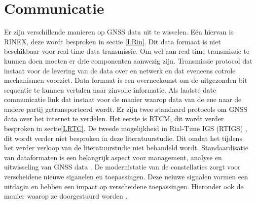 \section{Communicatie}
\label{LCom}
Er zijn verschillende manieren op GNSS data uit te wisselen. E\'en hiervan is RINEX, deze wordt besproken in sectie \ref{LRin}. Dit data formaat is niet beschikbaar voor real-time data transmissie. Om wel aan real-time transmissie te kunnen doen moeten er drie componenten aanwezig zijn. Transmissie protocol dat instaat voor de levering van de data over en netwerk en dat eveneens cotrole mechanismen voorziet. Data formaat is een overneekomst om de uitgezonden bit sequentie te kunnen vertalen naar zinvolle informatie. Als laatste date communicatie link dat instaat voor de manier waarop data van de ene naar de andere partij getransporteerd wordt. Er zijn twee standaard protocols om GNSS data over het internet te verdelen. Het eerste is RTCM, dit wordt verder besproken in sectie\ref{LRTC}. De tweede mogelijkheid in Rial-Time IGS (RTIGS) \cite{LBibRTCM}, dit wordt verder niet besproken in deze literatuurstudie. Dit omdat het tijdens het verder verloop van de literatuurstudie niet behandeld wordt. Standaardisatie van dataformaten is een belangrijk aspect voor management, analyse en uitwisseling van GNSS data \cite{LBibRINEX}. De modernistatie van de constellaties zorgt voor verscheidene nieuwe siganelen en toepassingen. Deze neiuwe signalen vormen een uitdagin en hebben een impact op verscheidene toepassingen. Hieronder ook de manier waarop ze doorgestuurd worden \cite{LBibRINEX2}. 

